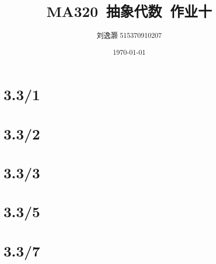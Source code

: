 \documentclass{article}
\title{MA320\ 抽象代数\ 作业十}
\author{刘逸灏 515370910207}
\date{\today}
\begin{document}
\maketitle

\section{3.3/1}


\section{3.3/2}


\section{3.3/3}


\section{3.3/5}


\section{3.3/7}
\end{document}
